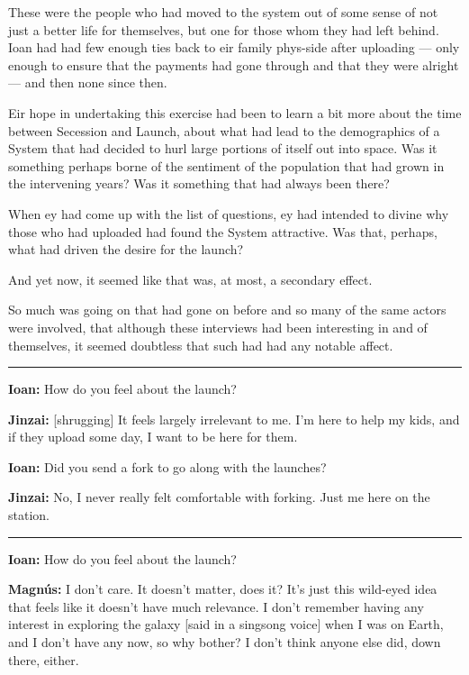 These were the people who had moved to the system out of some sense of not just a better life for themselves, but one for those whom they had left behind. Ioan had had few enough ties back to eir family phys-side after uploading — only enough to ensure that the payments had gone through and that they were alright — and then none since then.

Eir hope in undertaking this exercise had been to learn a bit more about the time between Secession and Launch, about what had lead to the demographics of a System that had decided to hurl large portions of itself out into space. Was it something perhaps borne of the sentiment of the population that had grown in the intervening years? Was it something that had always been there?

When ey had come up with the list of questions, ey had intended to divine why those who had uploaded had found the System attractive. Was that, perhaps, what had driven the desire for the launch?

And yet now, it seemed like that was, at most, a secondary effect.

So much was going on that had gone on before and so many of the same actors were involved, that although these interviews had been interesting in and of themselves, it seemed doubtless that such had had any notable affect.

\begin{center}\rule{0.5\linewidth}{0.5pt}\end{center}

\textbf{Ioan:} How do you feel about the launch?

\textbf{Jinzai:} {[}shrugging{]} It feels largely irrelevant to me. I'm here to help my kids, and if they upload some day, I want to be here for them.

\textbf{Ioan:} Did you send a fork to go along with the launches?

\textbf{Jinzai:} No, I never really felt comfortable with forking. Just me here on the station.

\begin{center}\rule{0.5\linewidth}{0.5pt}\end{center}

\textbf{Ioan:} How do you feel about the launch?

\textbf{Magnús:} I don't care. It doesn't matter, does it? It's just this wild-eyed idea that feels like it doesn't have much relevance. I don't remember having any interest in exploring the galaxy {[}said in a singsong voice{]} when I was on Earth, and I don't have any now, so why bother? I don't think anyone else did, down there, either.

